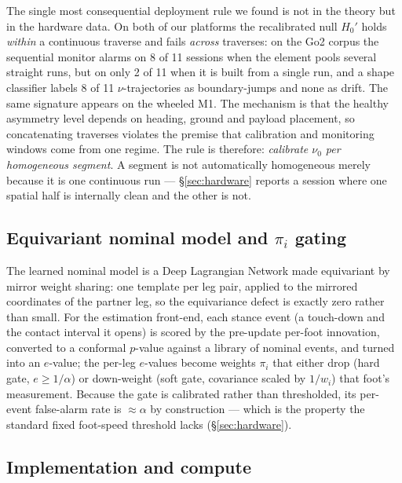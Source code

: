 The single most consequential deployment rule we found is not in the theory but in the hardware data. On both of our
platforms the recalibrated null $H_0'$ holds \emph{within} a continuous traverse and fails \emph{across} traverses: on
the Go2 corpus the sequential monitor alarms on 8 of 11 sessions when the element pools several straight runs, but on
only 2 of 11 when it is built from a single run, and a shape classifier labels 8 of 11 $\nu$-trajectories as
boundary-jumps and none as drift. The same signature appears on the wheeled M1. The mechanism is that the healthy
asymmetry level depends on heading, ground and payload placement, so concatenating traverses violates the premise that
calibration and monitoring windows come from one regime. The rule is therefore: \emph{calibrate $\nu_0$ per homogeneous
segment}. A segment is not automatically homogeneous merely because it is one continuous run --- \S\ref{sec:hardware}
reports a session where one spatial half is internally clean and the other is not.

\subsection{Equivariant nominal model and $\pi_i$ gating}

The learned nominal model is a Deep Lagrangian Network made equivariant by mirror weight sharing: one template per leg
pair, applied to the mirrored coordinates of the partner leg, so the equivariance defect is exactly zero rather than
small. For the estimation front-end, each stance event (a touch-down and the contact interval it opens) is scored by
the pre-update per-foot innovation, converted to a conformal $p$-value against a library of nominal events, and turned
into an $e$-value; the per-leg $e$-values become weights $\pi_i$ that either drop (hard gate, $e\ge1/\alpha$) or
down-weight (soft gate, covariance scaled by $1/w_i$) that foot's measurement. Because the gate is calibrated rather
than thresholded, its per-event false-alarm rate is $\approx\alpha$ by construction --- which is the property the
standard fixed foot-speed threshold lacks (\S\ref{sec:hardware}).

\subsection{Implementation and compute}
\label{sec:compute}

